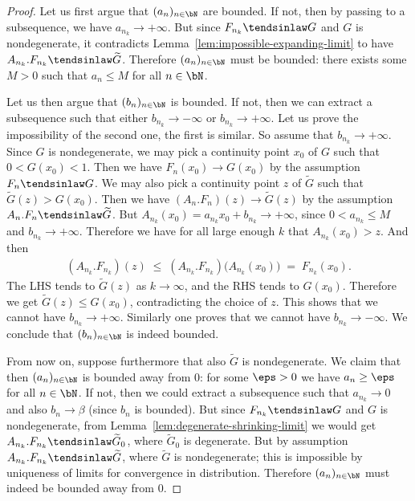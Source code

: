 \begin{proof}
  Let us first argue that $(a_n)_{n \in \bN}$ are bounded.
  If not, then by passing to a subsequence, we have $a_{n_k} \to +\infty$.
  But since $F_{n_k} \tendsinlaw G$ and $G$ is nondegenerate,
  it contradicts Lemma~\ref{lem:impossible-expanding-limit}
  to have $A_{n_k} . F_{n_k} \tendsinlaw \widetilde{G}$.
  Therefore $(a_n)_{n \in \bN}$ must be bounded: there exists
  some $M>0$ such that $a_n \le M$ for all $n \in \bN$.

  Let us then argue that $(b_n)_{n \in \bN}$ is bounded.
  If not, then we can extract a subsequence such
  that either $b_{n_k} \to -\infty$ or $b_{n_k} \to +\infty$.
  Let us prove the impossibility of the second one, the first is similar.
  So assume that $b_{n_k} \to +\infty$.
  Since $G$ is nondegenerate, we may pick a continuity point $x_0$
  of $G$ such that $0 < G(x_0) < 1$. Then we have $F_n(x_0) \to G(x_0)$
  by the assumption $F_n \tendsinlaw G$.
  We may also pick a continuity point $z$ of $\widetilde{G}$
  such that $\widetilde{G}(z) > G(x_0)$. Then we have
  $(A_n.F_n)(z) \to \widetilde{G}(z)$
  by the assumption $A_n.F_n \tendsinlaw \widetilde{G}$.
  But $A_{n_k}(x_0) = a_{n_k} x_0 + b_{n_k} \to +\infty$, since $0 < a_{n_k} \le M$
  and $b_{n_k} \to +\infty$. Therefore we have for all large enough $k$
  that $A_{n_k}(x_0) > z$. And then
  \begin{align*}
    (A_{n_k}.F_{n_k})(z) \; \le \; (A_{n_k}.F_{n_k})\big(A_{n_k}(x_0)\big) \; = \; F_{n_k}(x_0) .
  \end{align*}
  The LHS tends to $\widetilde{G}(z)$ as $k \to \infty$, and the RHS tends to $G(x_0)$.
  Therefore we get $\widetilde{G}(z) \le G(x_0)$, contradicting the choice of $z$.
  This shows that we cannot have $b_{n_k} \to +\infty$. Similarly one proves that
  we cannot have $b_{n_k} \to -\infty$. We conclude that $(b_n)_{n \in \bN}$
  is indeed bounded.

  From now on, suppose furthermore that also $\widetilde{G}$ is nondegenerate.
  We claim that then $(a_n)_{n \in \bN}$ is bounded away from $0$:
  for some $\eps > 0$ we have $a_n \ge \eps$ for all $n \in \bN$.
  If not, then we could extract a subsequence such that $a_{n_k} \to 0$
  and also $b_n \to \beta$ (since $b_n$ is bounded).
  But since $F_{n_k} \tendsinlaw G$ and $G$ is nondegenerate,
  from Lemma~\ref{lem:degenerate-shrinking-limit}
  we would get $A_{n_k} . F_{n_k} \tendsinlaw \widetilde{G}_0$,
  where $\widetilde{G}_0$ is degenerate. But by assumption
  $A_{n_k} . F_{n_k} \tendsinlaw \widetilde{G}$, where
  $\widetilde{G}$ is nondegenerate; this is impossible by uniqueness
  of limits for convergence in distribution. Therefore
  $(a_n)_{n \in \bN}$ must indeed be bounded away from $0$.


\end{proof}
